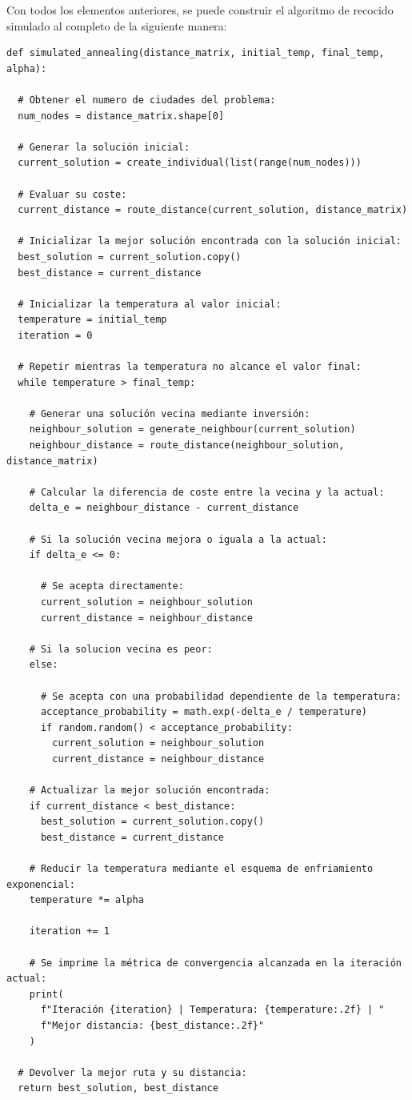 Con todos los elementos anteriores, se puede construir el algoritmo de recocido simulado al completo de la siguiente manera:
\newline
\begin{lstlisting}[style=PythonStyle]
def simulated_annealing(distance_matrix, initial_temp, final_temp, alpha):

  # Obtener el numero de ciudades del problema:
  num_nodes = distance_matrix.shape[0]

  # Generar la solución inicial:
  current_solution = create_individual(list(range(num_nodes)))

  # Evaluar su coste:
  current_distance = route_distance(current_solution, distance_matrix)

  # Inicializar la mejor solución encontrada con la solución inicial:
  best_solution = current_solution.copy()
  best_distance = current_distance

  # Inicializar la temperatura al valor inicial:
  temperature = initial_temp
  iteration = 0

  # Repetir mientras la temperatura no alcance el valor final:
  while temperature > final_temp:

    # Generar una solución vecina mediante inversión:
    neighbour_solution = generate_neighbour(current_solution)
    neighbour_distance = route_distance(neighbour_solution, distance_matrix)

    # Calcular la diferencia de coste entre la vecina y la actual:
    delta_e = neighbour_distance - current_distance

    # Si la solución vecina mejora o iguala a la actual:
    if delta_e <= 0:

      # Se acepta directamente:
      current_solution = neighbour_solution
      current_distance = neighbour_distance

    # Si la solucion vecina es peor:
    else:

      # Se acepta con una probabilidad dependiente de la temperatura:
      acceptance_probability = math.exp(-delta_e / temperature)
      if random.random() < acceptance_probability:
        current_solution = neighbour_solution
        current_distance = neighbour_distance

    # Actualizar la mejor solución encontrada:
    if current_distance < best_distance:
      best_solution = current_solution.copy()
      best_distance = current_distance

    # Reducir la temperatura mediante el esquema de enfriamiento exponencial:
    temperature *= alpha

    iteration += 1

    # Se imprime la métrica de convergencia alcanzada en la iteración actual:
    print(
      f"Iteración {iteration} | Temperatura: {temperature:.2f} | "
      f"Mejor distancia: {best_distance:.2f}"
    )

  # Devolver la mejor ruta y su distancia:
  return best_solution, best_distance
\end{lstlisting}

